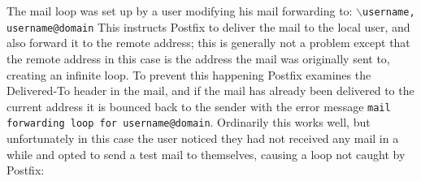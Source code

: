 The mail loop was set up by a user modifying his mail forwarding to:
\newline \tab{}\texttt{$\backslash$username, username@domain} \newline This
instructs Postfix to deliver the mail to the local user, and also forward
it to the remote address; this is generally not a problem except that the
remote address in this case is the address the mail was originally sent to,
creating an infinite loop.  To prevent this happening Postfix examines the
Delivered-To header in the mail, and if the mail has already been delivered
to the current address it is bounced back to the sender with the error
message \texttt{mail forwarding loop for username@domain}.  Ordinarily this
works well, but unfortunately in this case the user noticed they had not
received any mail in a while and opted to send a test mail to themselves,
causing a loop not caught by Postfix:

